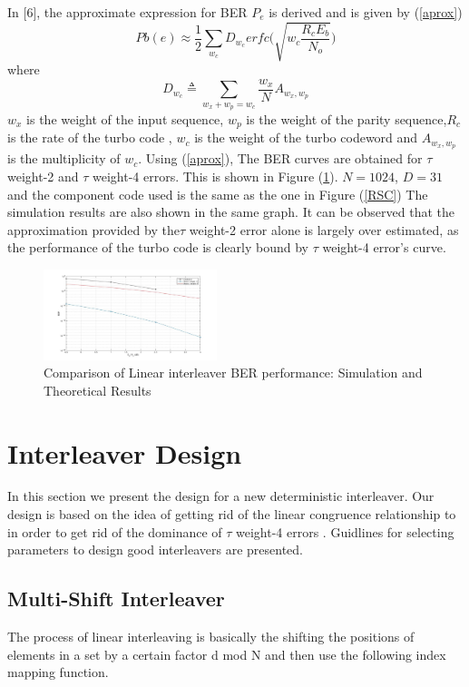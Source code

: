 \documentclass[twocolumn]{article}
\begin{document}
In [6], the approximate expression for BER $P_e$ is derived and is given by
(\ref{aprox})
\begin{equation} 
 Pb(e) \approx \frac{1}{2}\sum_{w_c}D_{w_c} 
  erfc \Bigg(\sqrt{w_c\frac{R_cE_b}{N_o}} \Bigg)
  \label{aprox}
  \end{equation}
 where 
  $$ D_{w_c}\triangleq \sum_{w_x+w_p=w_c} \frac{w_x}{N}A_{w_x,w_p}$$
  $w_x$ is the weight of the input sequence, $w_p$ is the weight of the parity 
  sequence,$R_c$ is the rate of the turbo code , $w_c$ is the weight of the turbo 
  codeword and $A_{w_x,w_p}$ is the multiplicity of $w_c$. Using (\ref{aprox}),
  The BER curves are obtained for $\tau$ weight-2 and $\tau$ weight-4 errors. 
  This is shown in Figure (\ref{comp}). $N=1024$, $D=31$ and the component code used is the
  same as the one in Figure (\ref{RSC})
  The simulation results are also shown in the same graph. It can be observed that
  the approximation provided by the$\tau$ weight-2 error alone is largely over estimated,
  as the performance of the turbo code is clearly bound by  $\tau$ weight-4 error's
  curve. 
\begin{figure}[h!]
\centering
		\includegraphics[width=0.45\textwidth]{D_31_N_1024_sim_VS_theory.png}
		\caption{Comparison of Linear interleaver BER performance: Simulation and Theoretical Results}
		\label{comp}
		\end{figure}





\section{Interleaver Design}
\label{sec}
In this section we present the design for a new deterministic interleaver. 
Our design is based on the idea of getting rid of the linear congruence
relationship to in order to get rid of the dominance of $\tau$ weight-4 errors
 . Guidlines for selecting
parameters to design good interleavers are presented.  
 \subsection{Multi-Shift Interleaver}
 The process of linear interleaving is basically the shifting the positions of elements in
 a set by a certain factor d mod N and then use the following index mapping function.
 
\end{document}
